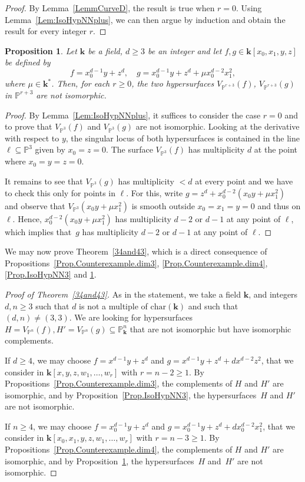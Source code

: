 \documentclass[11pt]{article}
\newtheorem{proposition}[lemma]{Proposition}
\theoremstyle{definition}
\renewcommand\k{{\mathbf k}}
\newcommand\p{{\mathbb P}}\let\PP\p
\newcommand{\kk}{\mathbf{k}}
\begin{document}
\begin{proof}
By Lemma~\ref{LemmCurveD}, the result is true when $r=0$. Using Lemma~\ref{Lem:IsoHypNNplus}, we can then argue by induction and obtain the result for every integer $r$.
\end{proof}

\begin{proposition}
\label{Prop.IsoHypNN4}
Let $\kk$ be a field, $d \geq 3$ be an integer and let $f,g\in\kk[x_0,x_1,y,z]$ be defined by
\[
f=x_0^{d-1}y+z^{d}, \quad g=x_0^{d-1}y+z^{d}+\mu x_0^{d-2}x_1^2,
\] where $\mu\in \k^*$. Then, for each $r\ge 0$, the two hypersurfaces $V_{\p^{r+3}}(f)$, $V_{\p^{r+3}}(g)$ in $\p^{r+3}$ are not isomorphic.
\end{proposition}

\begin{proof}
By Lemma~\ref{Lem:IsoHypNNplus}, it suffices to consider the case $r=0$ and to prove that $V_{\p^{3}}(f)$ and $V_{\p^{3}}(g)$ are not isomorphic. Looking at the derivative with respect to $y$, the singular locus of both hypersurfaces is contained in the line $\ell\subseteq \p^3$
given by $x_0 = z = 0$.
The surface $V_{\p^{3}}(f)$ has multiplicity $d$ at the point where $x_0=y=z=0$.

It remains to see that $V_{\p^{3}}(g)$ has multiplicity $< d$ at every point
and we have to check this only for points in $\ell$.
For this, write $g=z^d+ x_0^{d-2}(x_0y+\mu x_1^2)$ and observe that $V_{\PP^3}(x_0y+\mu x_1^2)$ is smooth outside $x_0=x_1=y=0$ and thus on $\ell$.
Hence, $x_0^{d-2}(x_0y+\mu x_1^2)$ has multiplicity $d-2$ or $d-1$ at any point of $\ell$, which implies that~$g$ has multiplicity $d-2$ or $d-1$ at any point of $\ell$.
\end{proof}

We may now prove Theorem~\ref{34and43}, which is a direct consequence of Propositions~\ref{Prop.Counterexample.dim3}, \ref{Prop.Counterexample.dim4}, \ref{Prop.IsoHypNN3} and \ref{Prop.IsoHypNN4}.

\begin{proof}[Proof of Theorem~\ref{34and43}]
As in the statement, we take a field $\kk$, and integers $d,n\ge 3$ such that $d$ is not a multiple of $\mathrm{char}(\kk)$ and such that $(d,n)\neq (3,3)$. We are looking for hypersurfaces $H=V_{\p^n}(f),H'=V_{\p^n}(g)\subseteq \p^n_\k$ that are not isomorphic but have isomorphic complements.

If $d\ge 4$, we may choose $f=x^{d-1}y+z^{d}$ and $g=x^{d-1}y+z^{d}+dx^{d-2}z^2$, that we
consider in $\k[x,y,z,w_1,\ldots,w_r]$ with $r=n-2\ge 1$. By Propositions~\ref{Prop.Counterexample.dim3}, the complements of $H$ and $H'$ are isomorphic, and by Proposition~\ref{Prop.IsoHypNN3}, the hypersurfaces~$H$ and $H'$ are not isomorphic.

If $n\ge 4$, we may choose $f=x_0^{d-1}y+z^{d}$ and $g=x_0^{d-1}y+z^{d}+dx_0^{d-2}x_1^2$, that we consider in
$\k[x_0,x_1,y,z,w_1,\ldots,w_r]$ with $r=n-3\ge 1$. By Propositions~\ref{Prop.Counterexample.dim4}, the complements of $H$ and $H'$ are isomorphic, and by Proposition~\ref{Prop.IsoHypNN4}, the hypersurfaces~$H$ and~$H'$ are not isomorphic.
\end{proof}
\end{document}
